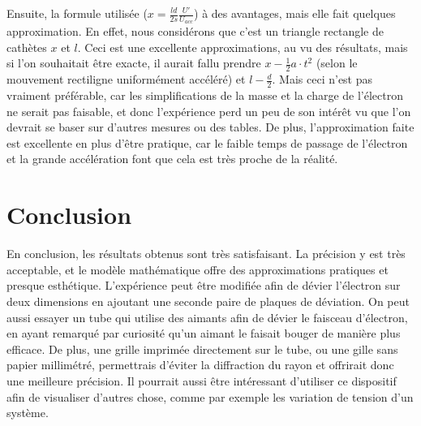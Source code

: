 \documentclass[11pt]{article}
\begin{document}
Ensuite, la formule utilisée ($x = \frac{ld}{2s}\frac{U'}{U_{acc}}$) à des avantages, mais elle fait quelques approximation. En effet, nous considérons que c'est un triangle rectangle de cathètes $x$ et $l$. Ceci est une excellente approximations, au vu des résultats, mais si l'on souhaitait être exacte, il aurait fallu prendre $x - \frac{1}{2} a \cdot t^2$ (selon le mouvement rectiligne uniformément accéléré) et $l - \frac{d}{2}$. Mais ceci n'est pas vraiment préférable, car les simplifications de la masse et la charge de l'électron ne serait pas faisable, et donc l'expérience perd un peu de son intérêt vu que l'on devrait se baser sur d'autres mesures ou des tables. De plus, l'approximation faite est excellente en plus d'être pratique, car le faible temps de passage de l'électron et la grande accélération font que cela est très proche de la réalité.

\section{Conclusion}

En conclusion, les résultats obtenus sont très satisfaisant. La précision y est très acceptable, et le modèle mathématique offre des approximations pratiques et presque esthétique. L'expérience peut être modifiée afin de dévier l'électron sur deux dimensions en ajoutant une seconde paire de plaques de déviation. On peut aussi essayer un tube qui utilise des aimants afin de dévier le faisceau d'électron, en ayant remarqué par curiosité qu'un aimant le faisait bouger de manière plus efficace. De plus, une grille imprimée directement sur le tube, ou une gille sans papier millimétré, permettrais d'éviter la diffraction du rayon et offrirait donc une meilleure précision. Il pourrait aussi être intéressant d'utiliser ce dispositif afin de visualiser d'autres chose, comme par exemple les variation de tension d'un système.
\end{document}

